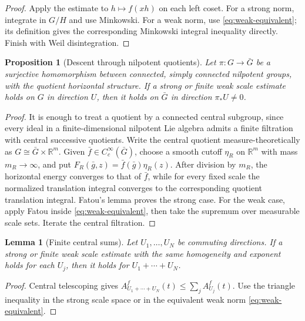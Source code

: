 \documentclass[11pt]{article}
\newtheorem{proposition}[theorem]{Proposition}
\newtheorem{lemma}[theorem]{Lemma}
\theoremstyle{definition}
\theoremstyle{remark}
\newcommand{\R}{\mathbb R}
\newcommand{\A}[2]{A_{#1}^{#2}}
\begin{document}
\begin{proof}
Apply the estimate to \(h\mapsto f(xh)\) on each left coset.  For a strong norm, integrate
in \(G/H\) and use Minkowski.  For a weak norm, use \eqref{eq:weak-equivalent}; its
definition gives the corresponding Minkowski integral inequality directly.  Finish with
Weil disintegration.
\end{proof}

\begin{proposition}[Descent through nilpotent quotients]\label{prop:quotient}
Let \(\pi:G\to\bar G\) be a surjective homomorphism between connected, simply
connected nilpotent groups, with the quotient horizontal structure.  If a strong or finite
weak scale estimate holds on \(G\) in direction \(U\), then it holds on \(\bar G\) in
direction \(\pi_*U\ne0\).
\end{proposition}

\begin{proof}
It is enough to treat a quotient by a connected central subgroup, since every ideal in a
finite-dimensional nilpotent Lie algebra admits a finite filtration with central successive
quotients.  Write the central quotient measure-theoretically as
\(G\cong\bar G\times\R^m\).  Given \(\bar f\in C_c^\infty(\bar G)\), choose a smooth
cutoff \(\eta_R\) on \(\R^m\) with mass \(m_R\to\infty\), and put
\(F_R(\bar g,z)=\bar f(\bar g)\eta_R(z)\).  After division by \(m_R\), the horizontal
energy converges to that of \(\bar f\), while for every fixed scale the normalized
translation integral converges to the corresponding quotient translation integral.
Fatou's lemma proves the strong case.  For the weak case, apply Fatou inside
\eqref{eq:weak-equivalent}, then take the supremum over measurable scale sets.  Iterate
the central filtration.
\end{proof}

\begin{lemma}[Finite central sums]\label{lem:central-sum}
Let \(U_1,\ldots,U_N\) be commuting directions.  If a strong or finite weak scale
estimate with the same homogeneity and exponent holds for each \(U_j\), then it holds for
\(U_1+\cdots+U_N\).
\end{lemma}

\begin{proof}
Central telescoping gives
\(\A{U_1+\cdots+U_N}{f}(t)\le\sum_j\A{U_j}{f}(t)\).  Use the triangle inequality in the
strong scale space or in the equivalent weak norm \eqref{eq:weak-equivalent}.
\end{proof}
\end{document}
